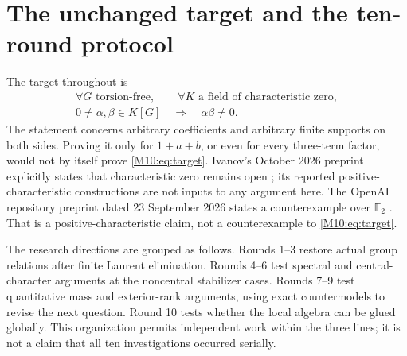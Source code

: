 \documentclass[11pt,a4paper,oneside]{report}
\theoremstyle{definition}
\theoremstyle{remark}
\begin{document}
\section{The unchanged target and the ten-round protocol}
The target throughout is
\begin{equation}\label{M10:eq:target}
\begin{gathered}
\forall G\text{ torsion-free},\qquad
\forall K\text{ a field of characteristic zero},\\
0\ne\alpha,\beta\in K[G]\quad\Longrightarrow\quad
\alpha\beta\ne0.
\end{gathered}
\end{equation}
The statement concerns arbitrary coefficients and arbitrary finite
supports on both sides. Proving it only for $1+a+b$, or even for every
three-term factor, would not by itself prove \eqref{M10:eq:target}.
Ivanov's October 2026 preprint explicitly states that characteristic
zero remains open \cite{B:Ivanov}; its reported positive-characteristic
constructions are not inputs to any argument here.
The OpenAI repository preprint dated 23 September 2026 states a
counterexample over $\mathbb F_2$ \cite{B:OpenAI}. That is a
positive-characteristic claim, not a counterexample to \eqref{M10:eq:target}.

The research directions are grouped as follows. Rounds 1--3 restore
actual group relations after finite Laurent elimination. Rounds 4--6
test spectral and central-character arguments at the noncentral
stabilizer cases. Rounds 7--9 test quantitative mass and exterior-rank
arguments, using exact countermodels to revise the next question.
Round 10 tests whether the local algebra can be glued globally.
This organization permits independent work within the three lines;
it is not a claim that all ten investigations occurred serially.
\end{document}
